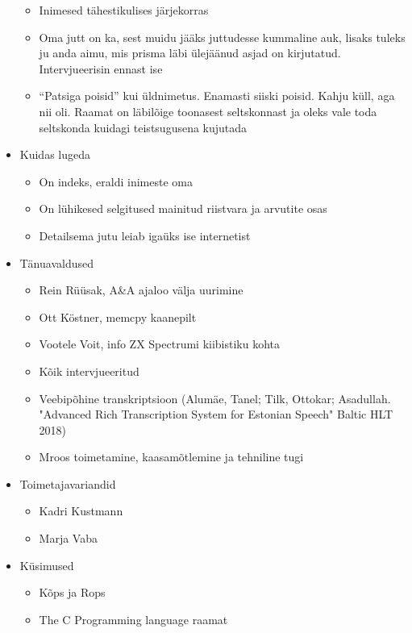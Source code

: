 \documentclass{tufte-book}
\begin{document}
\begin{itemize}
\begin{itemize}
		\item Inimesed tähestikulises järjekorras
		\item Oma jutt on ka, sest muidu jääks juttudesse kummaline auk, lisaks tuleks ju anda aimu, mis prisma läbi ülejäänud asjad on kirjutatud. Intervjueerisin ennast ise
		\item \enquote{Patsiga poisid} kui üldnimetus. Enamasti siiski poisid. Kahju küll, aga nii oli. Raamat on läbilõige toonasest seltskonnast ja oleks vale toda seltskonda kuidagi teistsugusena kujutada
	\end{itemize}
	\item Kuidas lugeda
	\begin{itemize}
		\item On indeks, eraldi inimeste oma
		\item On lühikesed selgitused mainitud riistvara ja arvutite osas
		\item Detailsema jutu leiab igaüks ise internetist
	\end{itemize}
	\item Tänuavaldused
	\begin{itemize}
		\item Rein Rüüsak, A\&A ajaloo välja uurimine
		\item Ott Köstner, memcpy kaanepilt
		\item Vootele Voit, info ZX Spectrumi kiibistiku kohta
		\item Kõik intervjueeritud
		\item Veebipõhine transkriptsioon (Alumäe, Tanel; Tilk, Ottokar; Asadullah. "Advanced Rich Transcription System for Estonian Speech" Baltic HLT 2018)
		\item Mroos toimetamine, kaasamõtlemine ja tehniline tugi
	\end{itemize}
	\item Toimetajavariandid
	\begin{itemize}
		\item Kadri Kustmann
		\item Marja Vaba
	\end{itemize}
	\item Küsimused
	\begin{itemize}
		\item Kõps ja Rops
		\item The C Programming language raamat
	\end{itemize}
 \end{itemize}

\mainmatter
\end{document}
